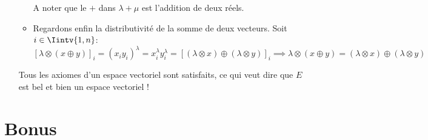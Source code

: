 \begin{exercice}
\begin{enumerate}
\begin{itemize}
        A noter que le $+$ dans $\lambda + \mu$ est l'addition de deux réels.
        \item Regardons enfin la distributivité de la somme de deux vecteurs. Soit $i \in \Iintv{1,n}$:
        $$[\lambda \otimes (x \oplus y)]_i = (x_i y_i)^\lambda = x_i^\lambda y_i^\lambda = [(\lambda \otimes x) \oplus (\lambda \otimes y)]_i \implies \lambda \otimes (x \oplus y) = (\lambda \otimes x) \oplus (\lambda \otimes y)$$
    \end{itemize}
    Tous les axiomes d'un espace vectoriel sont satisfaits, ce qui veut dire que $E$ est bel et bien un espace vectoriel !
\end{enumerate}
\end{exercice}

\section*{Bonus}

